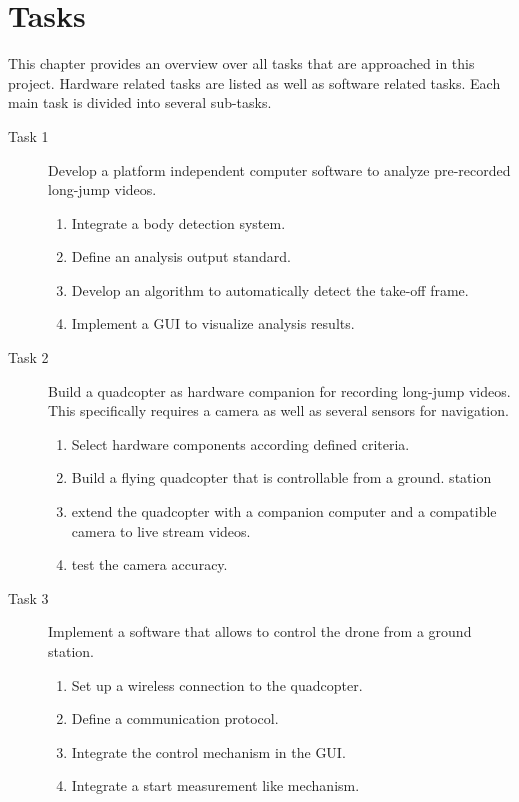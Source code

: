 \graphicspath{{./figures/}}
\chapter{Tasks}
This chapter provides an overview over all tasks that are approached in this
project.
Hardware related tasks are listed as well as software related tasks.
Each main task is divided into several sub-tasks.

\begin{description}
    \item[Task 1] Develop a platform independent computer software to analyze 
    pre-recorded long-jump videos.
    \begin{enumerate}
        \item Integrate a body detection system.
        \item Define an analysis output standard.
        \item Develop an algorithm to automatically detect the take-off frame. 
        \item Implement a \acs*{GUI} to visualize analysis results.
    \end{enumerate}
    \item[Task 2] Build a quadcopter as hardware companion for recording 
    long-jump videos. This specifically requires a camera as well as several
    sensors for navigation.
    \begin{enumerate}
        \item Select hardware components according defined criteria.
        \item Build a flying quadcopter that is controllable from a ground.
        station
        \item extend the quadcopter with a companion computer and a compatible
        camera to live stream videos.
        \item test the camera accuracy.
    \end{enumerate}
    \item[Task 3] Implement a software that allows to control the drone from a
    ground station.
    \begin{enumerate}
        \item Set up a wireless connection to the quadcopter.
        \item Define a communication protocol.
        \item Integrate the control mechanism in the \acs*{GUI}.
        \item Integrate a start measurement like mechanism.

\end{enumerate}
\end{description}
